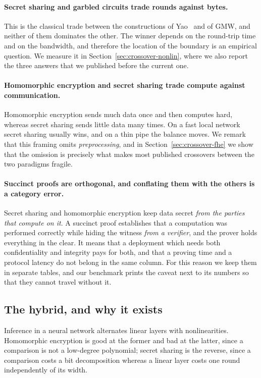 \documentclass[11pt]{article}
\begin{document}
\paragraph{Secret sharing and garbled circuits trade rounds against bytes.} This is the
classical trade between the constructions of Yao~\cite{Yao} and of GMW, and neither of them
dominates the other. The winner depends on the round-trip time and on the bandwidth, and
therefore the location of the boundary is an empirical question. We measure it in
Section~\ref{sec:crossover-nonlin}, where we also report the three answers that we published
before the current one.

\paragraph{Homomorphic encryption and secret sharing trade compute against
communication.} Homomorphic encryption sends much data once and then computes hard, whereas
secret sharing sends little data many times. On a fast local network secret sharing usually
wins, and on a thin pipe the balance moves. We remark that this framing omits
\emph{preprocessing}, and in Section~\ref{sec:crossover-fhe} we show that the omission is
precisely what makes most published crossovers between the two paradigms fragile.

\paragraph{Succinct proofs are orthogonal, and conflating them with the others is a
category error.} Secret sharing and homomorphic encryption keep data secret \emph{from the
parties that compute on it}. A succinct proof establishes that a computation was performed
correctly while hiding the witness \emph{from a verifier}, and the prover holds everything in
the clear. It means that a deployment which needs both confidentiality and integrity pays for
both, and that a proving time and a protocol latency do not belong in the same column. For
this reason we keep them in separate tables, and our benchmark prints the caveat next to its
numbers so that they cannot travel without it.

\subsection{The hybrid, and why it exists}

Inference in a neural network alternates linear layers with nonlinearities.
Homomorphic encryption is good at the former and bad at the latter, since a comparison is not
a low-degree polynomial; secret sharing is the reverse, since a comparison costs a bit
decomposition whereas a linear layer costs one round independently of its width.
\end{document}
